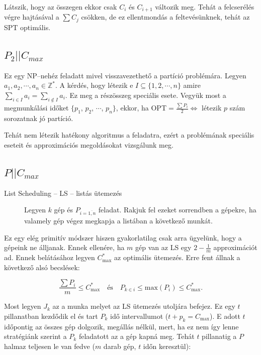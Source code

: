 Látszik, hogy az összegen ekkor csak $C_i$ és $C_{i+1}$ változik meg. Tehát a
felcserélés végre hajtásával a $\sum C_j$ csökken, de ez ellentmondás a
feltevésünknek, tehát az SPT optimális.

\subsection{ \texorpdfstring{$ P_2||C_{max}$} {P2||Cmax} }

Ez egy NP--nehéz feladatt mivel visszavezethető a partíció problémára. Legyen
$a_1, a_2, \cdots, a_n \in \mathbb{Z}^*$. A kérdés, hogy létezik e $I \subseteq
	\{1,2, \cdots, n \}$ amire $\sum_{i \in I} a_i = \sum_{i \not \in I} a_i$. Ez
meg a részösszeg speciális esete. Vegyük most a megmunkálási időket $\{p_1$, $p_2$,
$\cdots$, $p_n\}$, ekkor, ha OPT$=\frac{\sum P_i}{2} \Leftrightarrow$ létezik $p$
szám sorozatnak jó partíció.

Tehát nem létezik hatékony algoritmus a feladatra, ezért a problémának speciális
eseteit és approximációs megoldásokat vizsgálunk meg.

\subsection{ \texorpdfstring{$ P||C_{max}$} {P||Cmax} }

\begin{description}
	\item[List Scheduling -- LS -- listás ütemezés] Legyen $k$ gép és
	      $P_{i=\overline{1,n}}$ feladat. Rakjuk fel ezeket sorrendben a gépekre, ha
	      valamely gép végez megkapja a listában a következő munkát.
\end{description}

Ez egy elég primitív módszer hiszen gyakorlatilag csak arra ügyelünk, hogy a
gépeink ne álljanak. Ennek ellenére, ha $m$ gép van  az LS egy $2 - \frac{1}{m}$
approximációt ad. Ennek belátásához legyen $C^*_{\mbox{max}}$ az optimális
ütemezés. Erre fent állnak a következő alsó becslések:

\[ \frac{\sum P_i}{m} \leq C^*_{\mbox{max}} ~~~\mbox{ és }~~~
	P_{k \in i} \leq \mbox{max} (P_i) \leq C^*_{\mbox{max}}.
\]

Most legyen $J_k$ az a munka melyet az LS ütemezés utoljára befejez. Ez egy $t$
pillanatban kezdődik el és tart $P_k$ idő intervallumot ($t+p_k=C_{\mbox{max}}$).
E adott $t$ időpontig az összes gép dolgozik, megállás nélkül, mert, ha ez nem
így lenne stratégiánk szerint a $P_k$ feladatott az a gép kapná meg. Tehát $t$
pillanatig a $P$ halmaz teljesen le van fedve ($m$ darab gép, $t$ időn
keresztül):

